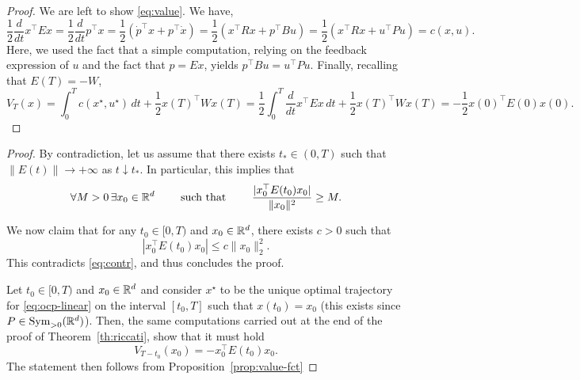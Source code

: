 \begin{proof}
    We are left to show \eqref{eq:value}. 
    We have,
    \begin{equation}
        \frac12\frac{d}{dt} x^\top E x 
        =\frac12\frac{d}{dt} p^\top x 
        = \frac12\left({\dot p}^\top x + p^\top \dot x\right)
        = \frac12\left(x^\top R x + p^\top B u\right)
        = \frac12\left(x^\top R x + u^\top P u \right)
        = c(x,u).
    \end{equation}
    Here, we used the fact that a simple computation, relying on the feedback expression of $u$ and the fact that $p=Ex$, yields $p^\top B u = u^\top Pu$.
    Finally, recalling that $E(T)=-W$,
    \begin{equation}
        V_T(x) =  \int_0^T c(x^\star,u^\star)\, dt + \frac12x(T)^\top W x(T) = \frac12\int_0^T \frac{d}{dt} x^\top E x\, dt+ \frac12x(T)^\top W x(T) 
        = -\frac12x(0)^\top E(0) x(0).
    \end{equation}
\end{proof}


\begin{proof}
    By contradiction, let us assume that there exists $t_*\in (0,T)$ such that $\|E(t)\|\rightarrow +\infty$ as $t\downarrow t_*$. In particular, this implies that 
    \begin{equation}
        \label{eq:contr}
        \forall M>0 \, \exists x_0\in \mathbb{R}^d \qquad \text{ such that }\qquad \frac{|x_0^\top E(t_0)x_0|}{\|x_0\|^2}\ge M.
    \end{equation}

    We now claim that for any $t_0\in [0,T)$ and $x_0\in \mathbb{R}^d$, there exists $c>0$ such that 
    \begin{equation}
        |x_0^\top E(t_0)x_0|\le c \|x_0\|_2^2.
    \end{equation}
    This contradicts \eqref{eq:contr}, and thus concludes the proof.
    
    Let $t_0\in [0,T)$ and $x_0\in \mathbb{R}^d$ and consider $x^\star$ to be the unique optimal trajectory for \eqref{eq:ocp-linear} on the interval $[t_0,T]$ such that $x(t_0)=x_0$ (this exists since $P\in \operatorname{Sym}_{>0}(\mathbb{R}^d)$). Then, the same computations carried out at the end of the proof of Theorem~\ref{th:riccati}, show that it must hold 
    \begin{equation}
        V_{T-t_0}(x_0)=-x_0^\top E(t_0)x_0.
    \end{equation}
    The statement then follows from Proposition~\ref{prop:value-fct}
\end{proof}


